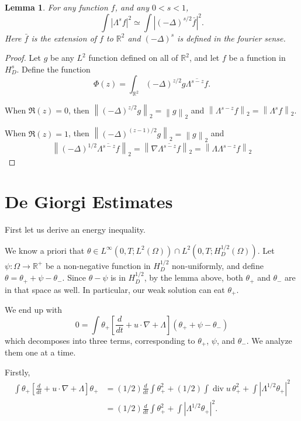 \documentclass[11pt]{amsart}
\newtheorem{lemma}[theorem]{Lemma}
\theoremstyle{remark}
\newcommand{\R}{\mathbb{R}}
\newcommand{\norm}[1]{\left\lVert#1\right\rVert}
\newcommand{\paren}[1]{\left( #1 \right)}
\newcommand{\bracket}[1]{\left[ #1 \right]}
\newcommand{\abs}[1]{\left\lvert #1 \right\rvert}
\newcommand{\grad}{\nabla}
\newcommand{\ddt}{\frac{d}{dt}}
\renewcommand{\div}{\operatorname{div}}
\newcommand{\Laplace}{\Delta}
\begin{document}
\begin{lemma}
For any function $f$, and any $0 < s < 1$,
\[ \int \abs{\Lambda^s f}^2 \simeq \int \abs{\paren{-\Laplace}^{s/2} \bar{f}}^2. \]
Here $\bar{f}$ is the extension of $f$ to $\R^2$ and $\paren{-\Laplace}^s$ is defined in the fourier sense.  
\end{lemma}

\begin{proof}
Let $g$ be any $L^2$ function defined on all of $\R^2$, and let $f$ be a function in $H^s_D$.  Define the function
\[ \Phi(z) = \int_{\R^2} \paren{-\Laplace}^{z/2} g \overline{\Lambda^{s-z} f}. \]

When $\Re(z) = 0$, then $\norm{\paren{-\Laplace}^{z/2} g}_2 = \norm{g}_2$ and $\norm{\Lambda^{s-z} f}_2 = \norm{\Lambda^s f}_2$.  

When $\Re(z)=1$, then $\norm{\paren{-\Laplace}^{(z-1)/2} g}_2 = \norm{g}_2$ and 
\[ \norm{\paren{-\Laplace}^{1/2} \overline{\Lambda^{s-z} f}}_2 = \norm{\grad \overline{ \Lambda^{s-z} f} }_2 = \norm{\Lambda \Lambda^{s-z} f}_2\]
\end{proof}


\section{De Giorgi Estimates}

First let us derive an energy inequality.  

We know a priori that $\theta \in L^\infty(0,T; L^2(\Omega)) \cap L^2(0,T; H_D^{1/2}(\Omega))$.  Let $\psi: \Omega \to \R^+$ be a non-negative function in $H_D^{1/2}$ non-uniformly, and define $\theta = \theta_+ + \psi - \theta_-$.  Since $\theta - \psi$ is in $H_D^{1/2}$, by the lemma above, both $\theta_+$ and $\theta_-$ are in that space as well.  In particular, our weak solution can eat $\theta_+$.  

We end up with
\[ 0 = \int \theta_+ \bracket{ \ddt + u \cdot \grad + \Lambda } \paren{\theta_+ + \psi - \theta_-} \]
which decomposes into three terms, corresponding to $\theta_+$, $\psi$, and $\theta_-$.  We analyze them one at a time.  

Firstly,
\begin{align*} 
\int \theta_+ \bracket{ \ddt + u \cdot \grad + \Lambda } \theta_+ &= (1/2) \ddt \int \theta_+^2 + (1/2) \int \div u \, \theta_+^2 + \int \abs{\Lambda^{1/2} \theta_+}^2
\\ &= (1/2) \ddt \int \theta_+^2 + \int \abs{\Lambda^{1/2} \theta_+}^2.
\end{align*}
\end{document}
